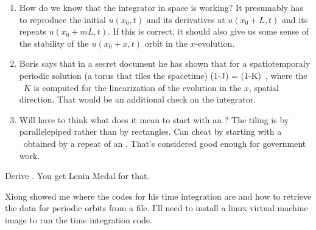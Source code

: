 \begin{description}
{\begin{description}
\begin{enumerate}
            needed for a spatial direction pseudo-spectral FFT
            integrator.
        \item How do we know that the integrator in space is working?
            It presumably has to reproduce the initial $u(x_0,t)$ and its
            derivatives at $u(x_0+L,t)$ and its repeats  $u(x_0+mL,t)$.
            If this is correct, it should also give us some sense of the
            stability of the $u(x_0+x,t)$ orbit in the $x$-evolution.
        \item Boris says that in a secret document he has shown that for
        a spatiotemporaly periodic solution (a torus that tiles the
        spacetime)
\beq
\det (1-J) = \det (1-K)
\,,
            where the \jacobianM\ $K$ is computed for the
            linearization of the evolution in the $x$, spatial direction.
            That would be an additional check on the integrator.
        \item Will have to think what does it mean to start with an \rpo?
        The tiling is by parallelepiped rather than by rectangles. Can
        cheat by starting with a \po\ obtained by a repeat of an \ppo.
        That's considered good enough for government work.
        \end{enumerate}

    \item[Exercise]
        Derive . You get Lenin Medal for that.

    \item[Discussion with Xiong]
    Xiong showed me where the codes for his time integration are and how
    to retrieve the data for periodic orbits from a file. I'll need to
    install a linux virtual machine image to run the time integration
    code.

    \end{description}
    }



\end{description}
